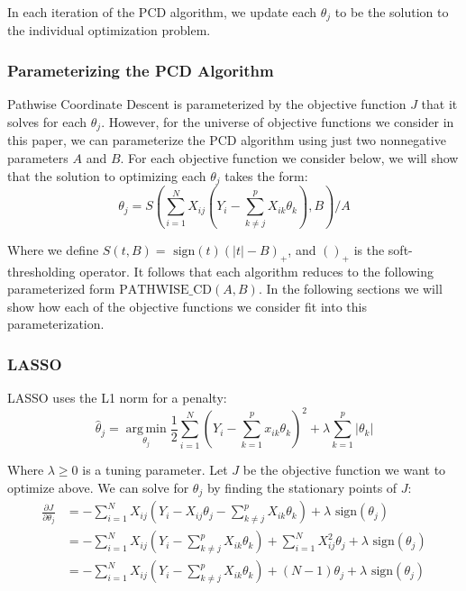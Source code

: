 \documentclass[11pt]{article}
\newcommand{\thh}{\hat{\theta}}
\newcommand{\sgn}{\text{ sign}}
\DeclareMathOperator*{\argmin}{arg\,min}
\newcommand{\pcd}{\text{PATHWISE\_CD}}
\begin{document}
In each iteration of the PCD algorithm, we update each $\theta_j$ to be the solution to the individual optimization problem.  

\subsubsection{Parameterizing the PCD Algorithm}
Pathwise Coordinate Descent is parameterized by the objective function $J$ that it solves for each $\theta_j$.  However, for the universe of objective functions we consider in this paper, we can parameterize the PCD algorithm using just two nonnegative parameters $A$ and $B$.  For each objective function we consider below, we will show that the solution to optimizing each $\theta_j$ takes the form:
	$$\theta_j = S\left(\sum\limits_{i=1}^N X_{ij}(Y_i - \sum\limits_{k \ne j}^p X_{ik}\theta_k), B\right)/A$$

Where we define\cite{ht} $S(t,B) = \sgn(t)(|t|-B)_+$, and $()_+$ is the soft-thresholding operator.  It follows that each algorithm reduces to the following parameterized form $\pcd(A, B)$.  In the following sections we will show how each of the objective functions we consider fit into this parameterization.  

\subsubsection{LASSO}
LASSO uses the L1 norm for a penalty:
	$$\thh_j = \argmin\limits_{\theta_j} \frac{1}{2} \sum\limits_{i=1}^N \left(Y_i - \sum\limits_{k=1}^px_{ik}\theta_k \right)^2 + \lambda \sum\limits_{k=1}^p|\theta_k|$$

Where $\lambda \geq 0$ is a tuning parameter.  Let $J$ be the objective function we want to optimize above.  We can solve for $\theta_j$ by finding the stationary points of $J$:
\begin{equation}\begin{split}
	\frac{\partial J}{\partial \theta_j}
		& = -\sum\limits_{i=1}^N X_{ij}(Y_i - X_{ij}\theta_j - \sum\limits_{k \ne j}^p X_{ik}\theta_k) + \lambda \sgn(\theta_j) \\
		& = -\sum\limits_{i=1}^N X_{ij}(Y_i - \sum\limits_{k \ne j}^p X_{ik}\theta_k) + \sum\limits_{i=1}^NX_{ij}^2\theta_j + \lambda \sgn(\theta_j) \\
		& = -\sum\limits_{i=1}^N X_{ij}(Y_i - \sum\limits_{k \ne j}^p X_{ik}\theta_k) +(N-1)\theta_j + \lambda \sgn(\theta_j) \\
\end{split}\end{equation}
\end{document}
